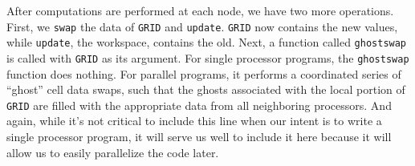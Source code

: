 After computations are performed at each node, we have two more operations.  First, we {\tt swap} the data of {\tt GRID} and {\tt update}.  {\tt GRID} now contains the new values, while {\tt update}, the workspace, contains the old.  Next, a function called {\tt ghostswap} is called with {\tt GRID} as its argument.  For single processor programs, the {\tt ghostswap} function does nothing.  For parallel programs, it performs a coordinated series of ``ghost'' cell data swaps, such that the ghosts associated with the local portion of {\tt GRID} are filled with the appropriate data from all neighboring processors.  And again, while it's not critical to include this line when our intent is to write a single processor program, it will serve us well to include it here because it will allow us to easily parallelize the code later.



